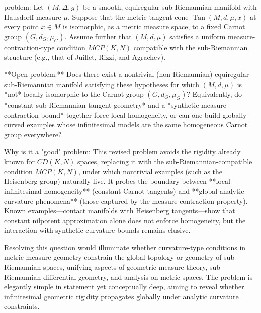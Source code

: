 problem:  
Let \((M, \Delta, g)\) be a smooth, equiregular sub-Riemannian manifold with Hausdorff measure \(\mu\).  
Suppose that the metric tangent cone \(\operatorname{Tan}(M, d, \mu, x)\) at every point \(x \in M\) is isomorphic, as a metric measure space, to a fixed Carnot group \((G, d_G, \mu_G)\).  
Assume further that \((M, d, \mu)\) satisfies a uniform measure-contraction-type condition \(MCP(K,N)\) compatible with the sub-Riemannian structure (e.g., that of Juillet, Rizzi, and Agrachev).  

**Open problem:**  
Does there exist a nontrivial (non-Riemannian) equiregular sub-Riemannian manifold satisfying these hypotheses for which \((M, d, \mu)\) is *not* locally isomorphic to the Carnot group \((G, d_G, \mu_G)\)?  
Equivalently, do *constant sub-Riemannian tangent geometry* and a *synthetic measure-contraction bound* together force local homogeneity, or can one build globally curved examples whose infinitesimal models are the same homogeneous Carnot group everywhere?

Why is it a "good" problem:  
This revised problem avoids the rigidity already known for \(CD(K,N)\) spaces, replacing it with the sub-Riemannian-compatible condition \(MCP(K,N)\), under which nontrivial examples (such as the Heisenberg group) naturally live. It probes the boundary between **local infinitesimal homogeneity** (constant Carnot tangents) and **global analytic curvature phenomena** (those captured by the measure-contraction property). Known examples—contact manifolds with Heisenberg tangents—show that constant nilpotent approximation alone does not enforce homogeneity, but the interaction with synthetic curvature bounds remains elusive.  

Resolving this question would illuminate whether curvature-type conditions in metric measure geometry constrain the global topology or geometry of sub-Riemannian spaces, unifying aspects of geometric measure theory, sub-Riemannian differential geometry, and analysis on metric spaces. The problem is elegantly simple in statement yet conceptually deep, aiming to reveal whether infinitesimal geometric rigidity propagates globally under analytic curvature constraints.